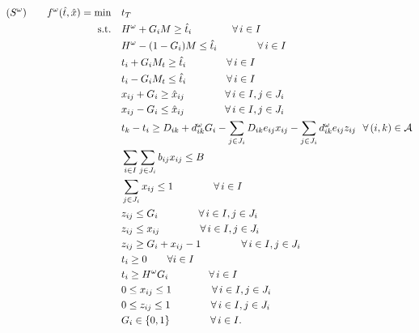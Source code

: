 \documentclass[11pt]{article}
\newcommand{\cA}{{\cal A}}
\begin{document}
	\begin{subequations}
		\label{prob:subOri}
		\begin{align}
		(S^\omega) \qquad 
		f^\omega(\hat{t},\hat{x}) = \min \quad & t_T \\
		\text{s.t.} \quad & H^\omega + G_i M \geq \hat{t}_i \qquad \qquad \forall \,i \in I \label{cons:sG1}\\
		& H^\omega - (1 - G_i) M \leq \hat{t}_i \qquad \qquad \forall \,i \in I \label{cons:sG2}\\
		& t_i + G_i M_t \geq \hat{t}_i \qquad \qquad \forall \,i \in I \label{cons:stG1}\\
		& t_i - G_i M_t \leq \hat{t}_i \qquad \qquad \forall \,i \in I \label{cons:stG2}\\
		& x_{ij} + G_i \geq \hat{x}_{ij} \qquad \qquad \forall \,i \in I, j \in J_i \label{cons:sxG1}\\
		& x_{ij} - G_i \leq \hat{x}_{ij} \qquad \qquad \forall \,i \in I, j \in J_i \label{cons:sxG2}\\
		& t_k - t_i \geq D_{ik} + d_{ik}^\omega G_i -\sum_{j \in J_i} D_{ik} e_{ij} x_{ij} - \sum_{j \in J_i} d_{ik}^\omega e_{ij} z_{ij} %
		\ \ 
		\forall \, (i,k) \in \cA \label{cons:subSep}\\
		& \sum_{i \in I}\sum_{j \in J_i} b_{ij}x_{ij} \leq B  \label{cons:subBudget}\\
		& \sum_{j \in J_i} x_{ij} \leq 1 \qquad \qquad \forall \,i \in I \label{cons:subBudget1}\\
		& z_{ij} \leq G_i \qquad \qquad \forall \,i \in I, j \in J_i \label{cons:sublinearize1}\\
		& z_{ij} \leq x_{ij} \qquad \qquad \forall \,i \in I, j \in J_i \label{cons:sublinearize2}\\
		& z_{ij} \geq G_i + x_{ij} - 1 \qquad \qquad \forall \,i \in I, j \in J_i \label{cons:sublinearize3}\\
		& {t_i \ge 0} \quad \quad \forall i \in I \\
		& t_i \geq H^\omega G_i \qquad \qquad \forall\, i \in I \label{cons:subH}\\
		& 0 \leq x_{ij} \leq 1 \qquad \qquad \forall \,i \in I, j \in J_i\\
		& 0 \leq z_{ij} \leq 1 \qquad \qquad \forall \,i \in I, j \in J_i \label{cons:subzbounds}\\
		& G_i \in \{0,1\} \qquad \qquad \forall \,i \in I. \label{cons:subInt}
		\end{align}
	\end{subequations}
	
\end{document}
